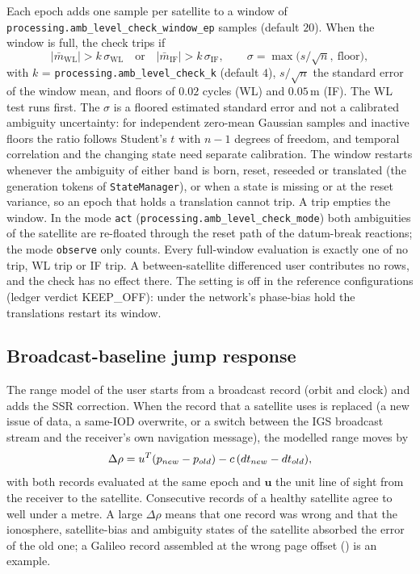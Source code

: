 \documentclass[main.tex]{subfiles}
\begin{document}
Each epoch adds one sample per satellite to a window of
\texttt{processing.amb\_level\_check\_window\_ep} samples (default $20$).  When
the window is full, the check trips if
\begin{equation}
|\bar{m}_{\mathrm{WL}}| > k\,\sigma_{\mathrm{WL}}
\quad\text{or}\quad
|\bar{m}_{\mathrm{IF}}| > k\,\sigma_{\mathrm{IF}},
\qquad
\sigma = \max\!\big(s/\sqrt{n},\ \text{floor}\big),
\label{eq:rt-level-trip}
\end{equation}
with $k$ = \texttt{processing.amb\_level\_check\_k} (default $4$), $s/\sqrt{n}$
the standard error of the window mean, and floors of $0.02$ cycles (WL) and
$0.05$\,m (IF).  The WL test runs first.  The $\sigma$ is a floored estimated
standard error and not a calibrated ambiguity uncertainty: for independent
zero-mean Gaussian samples and inactive floors the ratio follows Student's $t$
with $n-1$ degrees of freedom, and temporal correlation and the changing state
need separate calibration.  The window restarts whenever the ambiguity of
either band is born, reset, reseeded or translated (the generation tokens of
\texttt{StateManager}), or when a state is missing or at the reset variance, so
an epoch that holds a translation cannot trip.  A trip empties the window.  In
the mode \texttt{act} (\texttt{processing.amb\_level\_check\_mode}) both
ambiguities of the satellite are re-floated through the reset path of the
datum-break reactions; the mode \texttt{observe} only counts.  Every full-window
evaluation is exactly one of no trip, WL trip or IF trip.  A between-satellite
differenced user contributes no rows, and the check has no effect there.  The
setting is off in the reference configurations (ledger verdict KEEP\_OFF):
under the network's phase-bias hold the translations restart its window.

\subsection{Broadcast-baseline jump response}\label{sec:rt-ephjump}

The range model of the user starts from a broadcast record (orbit and clock)
and adds the SSR correction.  When the record that a satellite uses is
replaced (a new issue of data, a same-IOD overwrite, or a switch between the
IGS broadcast stream and the receiver's own navigation message), the modelled
range moves by
\begin{equation}
\Delta\rho = u^{T}(p_{new} - p_{old})
  - c\,(dt_{new} - dt_{old}),
\label{eq:rt-ephjump}
\end{equation}
with both records evaluated at the same epoch and $\bm{u}$ the unit line of
sight from the receiver to the satellite.  Consecutive records of a healthy
satellite agree to well under a metre.  A large $\Delta\rho$ means that one
record was wrong and that the ionosphere, satellite-bias and ambiguity states of
the satellite absorbed the error of the old one; a Galileo record assembled at
the wrong page offset () is an example.
\end{document}
